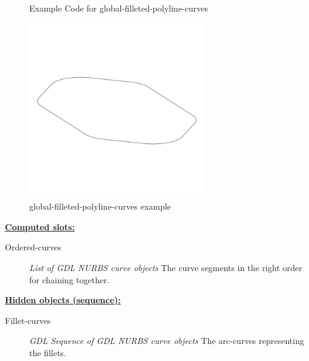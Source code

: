 \documentclass [11pt]{book}
\begin{document}
\begin{itemize}
\begin{figure}
\caption{Example Code for global-filleted-polyline-curves}

\label{fig:example-code-global-filleted-polyline-curves}

\end{figure}

\begin{figure}
\begin{center}
\includegraphics[width=3in,height=3in]{../images/example-global-filleted-polyline-curves.pdf}
\end{center}

\caption{global-filleted-polyline-curves example}

\label{fig:global-filleted-polyline-curves}

\end{figure}





\textbf{
\underline{Computed slots:}}

\begin{description}

\item [Ordered-curves]
\emph{List of GDL NURBS curve objects} The curve segments in the right order for chaining together.


\end{description}






\textbf{
\underline{Hidden objects (sequence):}}

\begin{description}

\item [Fillet-curves]
\emph{GDL Sequence of GDL NURBS curve objects} The arc-curves representing the fillets.



\end{description}
\end{itemize}
\end{document}
